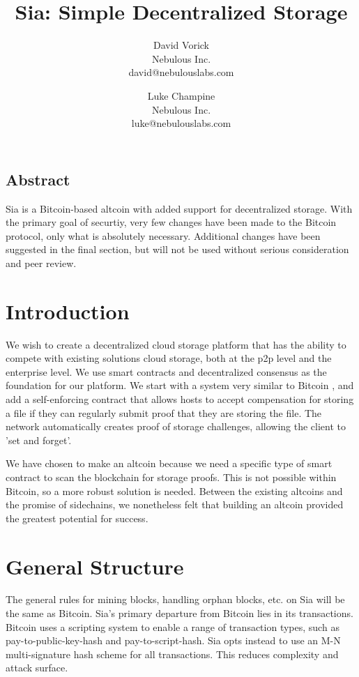 \documentclass[twocolumn]{article}
\begin{document}
\frenchspacing

\title{Sia: Simple Decentralized Storage}

\author{
{\rm David Vorick}\\
Nebulous Inc.\\
david@nebulouslabs.com
\and
{\rm Luke Champine}\\
Nebulous Inc.\\
luke@nebulouslabs.com
}

\maketitle

\subsection*{Abstract}
Sia is a Bitcoin-based altcoin with added support for decentralized storage.
With the primary goal of securtiy, very few changes have been made to the Bitcoin protocol, only what is absolutely necessary.
Additional changes have been suggested in the final section, but will not be used without serious consideration and peer review.

\section{Introduction}
We wish to create a decentralized cloud storage platform that has the ability to compete with existing solutions cloud storage, both at the p2p level and the enterprise level.
We use smart contracts and decentralized consensus as the foundation for our platform.
We start with a system very similar to Bitcoin \cite{btc}, \cite{btcdg} and add a self-enforcing contract that allows hosts to accept compensation for storing a file if they can regularly submit proof that they are storing the file.
The network automatically creates proof of storage challenges, allowing the client to 'set and forget'.

We have chosen to make an altcoin because we need a specific type of smart contract to scan the blockchain for storage proofs.
This is not possible within Bitcoin, so a more robust solution is needed.
Between the existing altcoins and the promise of sidechains, we nonetheless felt that building an altcoin provided the greatest potential for success.

\section{General Structure}
The general rules for mining blocks, handling orphan blocks, etc. on Sia will be the same as Bitcoin.
Sia's primary departure from Bitcoin lies in its transactions.
Bitcoin uses a scripting system to enable a range of transaction types, such as pay-to-public-key-hash and pay-to-script-hash.
Sia opts instead to use an M-N multi-signature hash scheme for all transactions.
This reduces complexity and attack surface.
\end{document}
